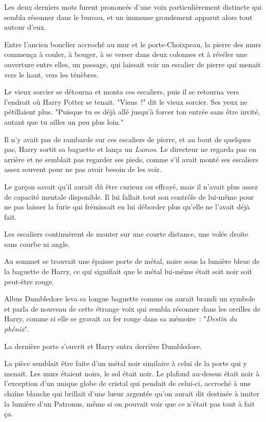 Les deux derniers mots furent prononcés d'une voix particulièrement distincte qui sembla résonner dans le bureau, et un immense grondement apparut alors tout autour d'eux.

Entre l'ancien bouclier accroché au mur et le porte-Choixpeau, la pierre des murs commença à couler, à bouger, à se verser dans deux colonnes et à révéler une ouverture entre elles, un passage, qui laissait voir un escalier de pierre qui menait vers le haut, vers les ténèbres.

Le vieux sorcier se détourna et monta ces escaliers, puis il se retourna vers l'endroit où Harry Potter se tenait. "Viens~!" dit le vieux sorcier. Ses yeux ne pétillaient plus. "Puisque tu es déjà allé jusqu'à forcer ton entrée sans être invité, autant que tu ailles un peu plus loin."

\later

Il n'y avait pas de rambarde sur ces escaliers de pierre, et au bout de quelques pas, Harry sortit sa baguette et lança un \emph{Lumos}. Le directeur ne regarda pas en arrière et ne semblait pas regarder ses pieds, comme s'il avait monté ses escaliers assez souvent pour ne pas avoir besoin de les voir.

Le garçon savait qu'il aurait dû être curieux ou effrayé, mais il n'avait plus assez de capacité mentale disponible. Il lui fallait tout son contrôle de lui-même pour ne pas laisser la furie qui frémissait en lui déborder plus qu'elle ne l'avait déjà fait.

Les escaliers continuèrent de monter sur une courte distance, une volée droite sans courbe ni angle.

Au sommet se trouvait une épaisse porte de métal, noire sous la lumière bleue de la baguette de Harry, ce qui signifiait que le métal lui-même était soit noir soit peut-être rouge.

Albus Dumbledore leva sa longue baguette comme on aurait brandi un symbole et parla de nouveau de cette étrange voix qui sembla résonner dans les oreilles de Harry, comme si elle se gravait au fer rouge dans sa mémoire~: "\emph{Destin du phénix}".

La dernière porte s'ouvrit et Harry entra derrière Dumbledore.

La pièce semblait être faite d'un métal noir similaire à celui de la porte qui y menait. Les murs étaient noirs, le sol était noir. Le plafond au-dessus était noir à l'exception d'un unique globe de cristal qui pendait de celui-ci, accroché à une chaîne blanche qui brillait d'une lueur argentée qu'on aurait dit destinée à imiter la lumière d'un Patronus, même si on pouvait voir que ce n'était pas tout à fait ça.

